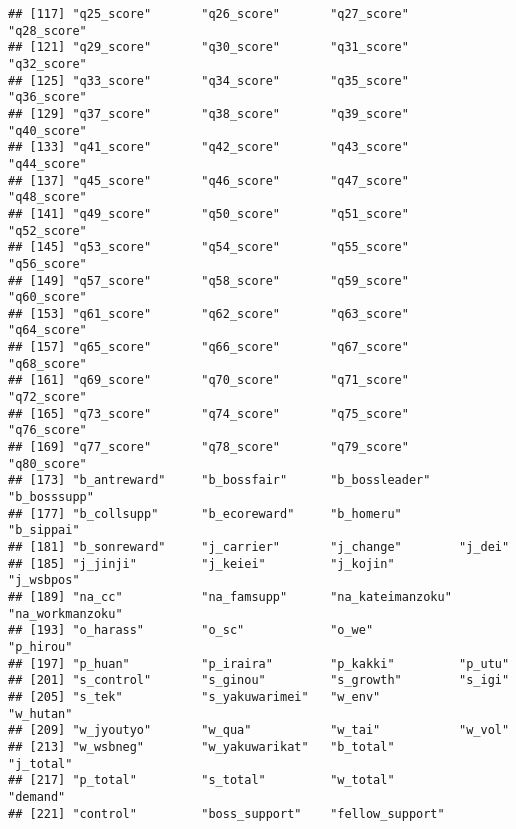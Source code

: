 \documentclass[
  xelatex,ja=standard]{bxjsarticle}
\begin{document}
\begin{verbatim}
## [117] "q25_score"       "q26_score"       "q27_score"       "q28_score"      
## [121] "q29_score"       "q30_score"       "q31_score"       "q32_score"      
## [125] "q33_score"       "q34_score"       "q35_score"       "q36_score"      
## [129] "q37_score"       "q38_score"       "q39_score"       "q40_score"      
## [133] "q41_score"       "q42_score"       "q43_score"       "q44_score"      
## [137] "q45_score"       "q46_score"       "q47_score"       "q48_score"      
## [141] "q49_score"       "q50_score"       "q51_score"       "q52_score"      
## [145] "q53_score"       "q54_score"       "q55_score"       "q56_score"      
## [149] "q57_score"       "q58_score"       "q59_score"       "q60_score"      
## [153] "q61_score"       "q62_score"       "q63_score"       "q64_score"      
## [157] "q65_score"       "q66_score"       "q67_score"       "q68_score"      
## [161] "q69_score"       "q70_score"       "q71_score"       "q72_score"      
## [165] "q73_score"       "q74_score"       "q75_score"       "q76_score"      
## [169] "q77_score"       "q78_score"       "q79_score"       "q80_score"      
## [173] "b_antreward"     "b_bossfair"      "b_bossleader"    "b_bosssupp"     
## [177] "b_collsupp"      "b_ecoreward"     "b_homeru"        "b_sippai"       
## [181] "b_sonreward"     "j_carrier"       "j_change"        "j_dei"          
## [185] "j_jinji"         "j_keiei"         "j_kojin"         "j_wsbpos"       
## [189] "na_cc"           "na_famsupp"      "na_kateimanzoku" "na_workmanzoku" 
## [193] "o_harass"        "o_sc"            "o_we"            "p_hirou"        
## [197] "p_huan"          "p_iraira"        "p_kakki"         "p_utu"          
## [201] "s_control"       "s_ginou"         "s_growth"        "s_igi"          
## [205] "s_tek"           "s_yakuwarimei"   "w_env"           "w_hutan"        
## [209] "w_jyoutyo"       "w_qua"           "w_tai"           "w_vol"          
## [213] "w_wsbneg"        "w_yakuwarikat"   "b_total"         "j_total"        
## [217] "p_total"         "s_total"         "w_total"         "demand"         
## [221] "control"         "boss_support"    "fellow_support"
\end{verbatim}
\end{document}
